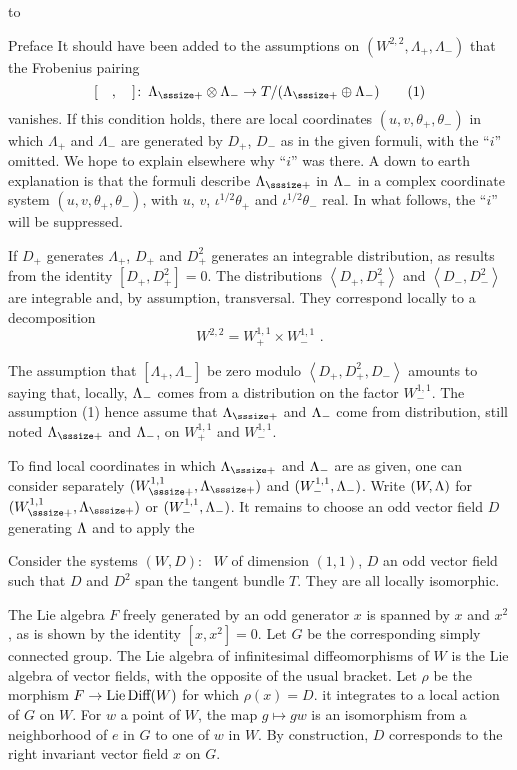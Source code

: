 \document
{}
\smallskip
\hbox to \hsize{\hrulefill}

\bigskip
\subhead
Preface
\endsubhead
\dspace
It should have been added to the assumptions on
$(W^{2,2},\Lambda_\plus,\Lambda_-)$ that the Frobenius
pairing
$$
[\quad,\quad]\colon\,
\Lambda_\plus\otimes\Lambda_-\to
T/(\Lambda_\plus\oplus\Lambda_-)
\tag1
$$
vanishes.
If this condition holds, there are local coordinates
$(u,v,\theta_\plus,\theta_-)$ in which $\Lambda_\plus$ and
$\Lambda_-$ are generated by $D_\plus$, $D_-$ as in the
given formuli, with the ``$i$'' omitted.
We hope to explain elsewhere why ``$i$'' was there.
A down to earth explanation is that the formuli describe
$\Lam_\plus$ in ${\Lambda}_-$ in a complex coordinate system
$(u,v,\theta_\plus,\theta_-)$, with $u$, $v$,
$\iota^{1/2}\theta_\plus$ and $\iota^{1/2}\theta_-$
real.
In what follows, the ``$i$'' will be suppressed.



If $D_\plus$ generates $\Lambda_\plus$, $D_\plus$ and $D_\plus^2$
generates an integrable distribution, as results from
the identity $[D_\plus,D_\plus^2]=0$.
The distributions $\left<D_\plus,D_\plus^2\right>$ and
$\left<D_-,D_-^2\right>$ are integrable and, by
assumption, transversal.
They correspond locally to a decomposition
$$
W^{2,2}=W_\plus^{1,1}\times W_-^{1,1}\,\,.
$$

The assumption that $[\Lambda_\plus,\Lambda_-]$ be zero
modulo $\left<D_\plus,D_\plus^2,D_-\right>$ amounts to saying
that, locally, ${\Lambda}_-$ comes from a distribution on the
factor $W_-^{1,1}$.
The assumption (1) hence assume that $\Lam_\plus$ and
${\Lambda}_-$ come from distribution, still noted $\Lam_\plus$
and ${\Lambda}_-$, on $W_\plus^{1,1}$ and $W_-^{1,1}$.
\enddemo

To find local coordinates in which $\Lam_\plus$ and ${\Lambda}_-$
are as given, one can consider separately
$(W_\plus^{1,1},\Lam_\plus)$ and $(W_-^{1,1},{\Lambda}_-)$.
Write $(W,{\Lambda})$ for $(W_\plus^{1,1},\Lam_\plus)$ or
$(W_-^{1,1},{\Lambda}_-)$.
It remains to choose an odd vector field $D$ generating
${\Lambda}$ and to apply the

Consider the systems $(W,D)$: \ $W$ of dimension
$(1,1)$, $D$ an odd vector field such that $D$ and $D^2$
span the tangent bundle $T$.
They are all locally isomorphic.
\endproclaim

The Lie algebra $F$ freely generated by an odd generator
$x$ is spanned by $x$ and $x^2$, as is shown by the
identity $[x,x^2]=0$.
Let $G$ be the corresponding simply connected group.
The Lie algebra of infinitesimal diffeomorphisms of $W$
is the Lie algebra of vector fields, with the opposite
of the usual bracket.
Let $\rho$ be the morphism $F\to\text{\rm Lie}\,\text{\rm Diff}(W)$ for
which $\rho(x)=D$.
it integrates to a local action of $G$ on $W$.
For $w$ a point of $W$, the map $g\mapsto gw$ is an
isomorphism from a neighborhood of $e$ in $G$ to one of
$w$ in $W$.
By construction, $D$ corresponds to the right invariant
vector field $x$ on $G$.
\enddemo

